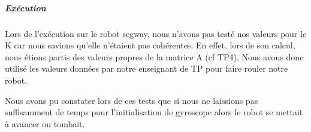 \documentclass[a4paper,12pt]{article}
\begin{document}
\subparagraph{Exécution}

Lors de l'exécution sur le robot segway, nous n'avons pas testé nos valeurs pour le K car nous savions qu'elle n'étaient pas cohérentes. En effet, lors de son calcul, nous étions partis des valeurs propres de la matrice A (cf TP4). Nous avons donc utilisé les valeurs données par notre enseignant de TP pour faire rouler notre robot.

Nous avons pu constater lors de ces tests que si nous ne laissions pas suffisamment de temps pour l'initialisation de gyroscope alors le robot se mettait à avancer ou tombait.
\end{document}
